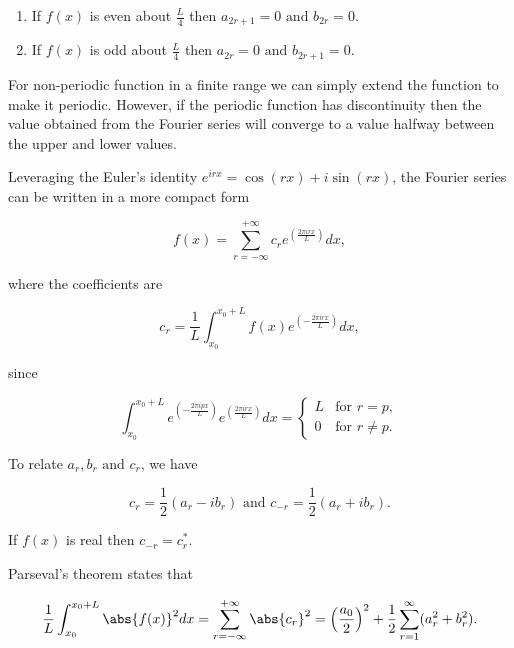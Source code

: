 \documentclass[english,a4paper,12pt]{report}
\begin{document}
\begin{enumerate}
    \item If \(f(x)\) is even about \(\frac{L}{4} \) then \(a_{2r+1} = 0 \text { and } b_{2r} = 0 \).
    \item If \(f(x)\) is odd about \(\frac{L}{4} \) then \(a_{2r} = 0 \text { and } b_{2r+1} = 0 \).      
\end{enumerate}

For non-periodic function in a finite range we can simply extend the function to make it periodic. However, if the periodic function has discontinuity then the value obtained from the Fourier series will converge to a value halfway between the upper and lower values.

Leveraging the Euler's identity \(e^{irx} = \cos (rx) + i\sin (rx) \), the Fourier series can be written in a more compact form

\begin{equation}
    f(x) = \sum_{r=-\infty}^{+\infty} c_{r} e^{\left( \frac{2\pi i rx}{L}  \right)}dx,  
\end{equation}

where the coefficients are 

\begin{equation}
    c_{r} = \frac{1}{L} \int_{x_0 }^{x_0 + L} f(x)e^{\left( -\frac{2\pi irx}{L}  \right)}dx,     
\end{equation}

since

\begin{equation}
    \int_{x_0 }^{x_0 + L} e^{\left( -\frac{2\pi ipx}{L}\right)} e^{\left( \frac{2\pi irx}{L} \right)} dx = \begin{cases} L & \text{for } r=p, \\ 0 & \text{for } r\neq p.\end{cases}   
\end{equation}

To relate \(a_{r},b_{r} \text { and } c_{r}  \), we have

\begin{equation}
    c_{r} = \frac{1}{2} (a_{r} -ib_{r}  ) \text { and } c_{-r} = \frac{1}{2}(a_{r} + ib_{r}  ).   
\end{equation}

If \(f(x)\) is real then \(c_{-r} = c_{r}^*  \).

Parseval's theorem states that 

\begin{equation}
    \frac{1}{L} \int_{x_0 }^{x_0 + L} \abs{f(x)}^2 dx = \sum_{r=-\infty}^{+\infty} \abs{c_{r} }^2 = \left(\frac{a_0 }{2} \right)^2 + \frac{1}{2} \sum_{r=1}^{\infty} (a_{r}^2 + b_{r}^2).         
\end{equation}
\end{document}
